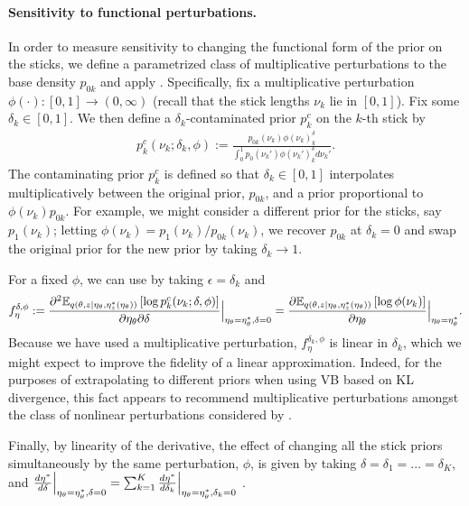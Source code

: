 

\paragraph{Sensitivity to functional perturbations.}
%
In order to measure sensitivity to changing the functional form of the prior on
the sticks, we define a parametrized class of multiplicative perturbations to
the base density $p_{0k}$ and apply .
Specifically, fix a multiplicative perturbation $\phi(\cdot): [0, 1] \rightarrow
(0, \infty)$ (recall that the stick lengths $\nu_k$  lie in $[0, 1]$). Fix some
$\delta_k\in[0, 1]$.  We then define a $\delta_k$-contaminated prior $p^c_{k}$ on
the $k$-th stick by
%
\begin{align}
\label{eq:expon_perturb}
	p^c_{k}(\nu_k ; \delta_k, \phi) :=
  \frac{p_{0k}(\nu_k)\phi(\nu_k)^\delta_k}
       {\int_0^1 p_0(\nu_k')\phi(\nu_k')^\delta_k d\nu_k'}.
\end{align}
%
The contaminating prior $p^c_{k}$ is defined so that $\delta_k\in[0, 1]$
interpolates multiplicatively between the original prior, $p_{0k}$, and a prior
proportional to $\phi(\nu_k)p_{0k}$. For example, we might consider a different
prior for the sticks, say $p_1(\nu_k)$; letting $\phi(\nu_k) = p_1(\nu_k) /
p_{0k}(\nu_k)$, we recover $p_{0k}$ at $\delta_k = 0$ and swap the original
prior for the new prior by taking $\delta_k \rightarrow 1$.

For a fixed $\phi$, we can use  by taking
$\epsilon = \delta_k$ and
%
\begin{align*}
f^{\delta,\phi}_\eta :=
\frac{\partial^2
    \mathbb{E}_{q\left(\theta, z \vert \eta_\theta, \eta_z^{*}(\eta_\theta)\right)} \left[ \log p^c_{k}(\nu_k ; \delta, \phi) \right]}
{\partial \eta_\theta \partial \delta}
    \Big\rvert_{\eta_\theta = \eta_\theta^{*}, \delta = 0} =
\frac{\partial
    \mathbb{E}_{q\left(\theta, z \vert \eta_\theta, \eta_z^{*}(\eta_\theta)\right)} \left[ \log\phi(\nu_k) \right]}
{\partial \eta_\theta}
    \Big\rvert_{\eta_\theta = \eta_\theta^{*}}.
\end{align*}
%
Because we have used a multiplicative perturbation, $f^{\delta_k, \phi}_\eta$
is linear in $\delta_k$, which we might expect to improve the fidelity of a
linear approximation.
%
Indeed, for the purposes of extrapolating to different priors
when using VB based on KL divergence, this
fact appears to recommend multiplicative perturbations amongst the class of
nonlinear perturbations considered by \citet{gustafson:1996:localposterior}.

Finally, by linearity of the derivative, the effect of changing all the stick
priors simultaneously by the same perturbation, $\phi$, is given by taking
$\delta = \delta_1 = ... = \delta_K$, and
$\frac{d\eta^{*}}{d\delta} \Big\rvert_{\eta_\theta = \eta_\theta^{*}, \delta=0} =
    \sum_{k=1}^{K} \frac{d\eta^{*}}{d\delta_k}
    \Big\rvert_{\eta_\theta = \eta_\theta^{*}, \delta_k=0}$
\citep{gustafson:1996:localmarginals}.
